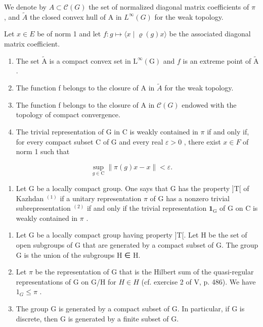 We denote by \(A \subset \mathcal{C}(G)\) the set of normalized diagonal matrix coefficients of \(\pi\) , and \(\widetilde{A}\) the closed convex hull of A in \(L^{\infty}(G)\) for the weak topology.

Let \(x \in E\) be of norm 1 and let \(f: g \mapsto \langle x \mid \varrho(g)x \rangle\) be the associated diagonal matrix coefficient.

\begin{enumerate}
\def\labelenumi{\alph{enumi})}
\item
  The set \(\widetilde{\mathrm{A}}\) is a compact convex set in \(\mathrm{L}^{\infty}(\mathrm{G})\) and \(f\) is an extreme point of \(\widetilde{\mathrm{A}}\) .
\item
  The function f belongs to the closure of A in \(\widetilde{A}\) for the weak topology.
\item
  The function f belongs to the closure of A in \(\mathcal{C}(G)\) endowed with the topology of compact convergence.
\item
  The trivial representation of G in C is weakly contained in \(\pi\) if and only if, for every compact subset C of G and every real \(\varepsilon > 0\) , there exist \(x \in F\) of norm 1 such that
\end{enumerate}

\[
\sup _ {g \in \mathrm{C}} \| \pi (g) x - x \| <   \varepsilon .
\]

\begin{enumerate}
\def\labelenumi{\arabic{enumi})}
\setcounter{enumi}{13}
\tightlist
\item
  Let G be a locally compact group. One says that G has the property ]T[ of Kazhdan \(^{(1)}\) if a unitary representation \(\pi\) of G has a nonzero trivial subrepresentation \(^{(2)}\) if and only if the trivial representation \(\mathbf{1}_{\text{G}}\) of G on C is weakly contained in \(\pi\) .
\end{enumerate}

\begin{enumerate}
\def\labelenumi{\alph{enumi})}
\item
  Let G be a locally compact group having property ]T[. Let H be the set of open subgroups of G that are generated by a compact subset of G. The group G is the union of the subgroups H ∈ H.
\item
  Let \(\pi\) be the representation of G that is the Hilbert sum of the quasi-regular representations of G on G/H for \(H \in H\) (cf. exercise 2 of V, p. 486). We have \(1_{G} \leqslant \pi\) .
\item
  The group G is generated by a compact subset of G. In particular, if G is discrete, then G is generated by a finite subset of G.
\end{enumerate}

